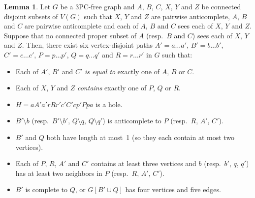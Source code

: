 \documentclass[11pt]{article}
\newcommand{\sm}{\setminus}
\theoremstyle{definition}
\newtheorem{lemma}[theorem]{Lemma}
\theoremstyle{definition}
\begin{document}
\begin{lemma}
  \label{l:exact1}
  Let $G$ be a 3PC-free graph and $A$, $B$, $C$, $X$, $Y$ and $Z$ be
  connected disjoint subsets of $V(G)$ such that $X$, $Y$ and $Z$ are
  pairwise anticomplete, $A$, $B$ and $C$ are pairwise anticomplete
  and each of $A$, $B$ and $C$ sees each of $X$, $Y$ and $Z$.  Suppose
  that no connected proper subset of $A$ (resp.\ $B$ and $C$) sees
  each of $X$, $Y$ and $Z$.  Then, there exist six vertex-disjoint
  paths $A' = a\dots a'$, $B'= b\dots b'$, $C'=c\dots c'$,
  $P= p\dots p'$, $Q = q\dots q'$ and $R = r\dots r'$ in $G$ such
  that:

  \begin{itemize}
  \item Each of $A'$, $B'$ and $C'$ \emph{is equal to} exactly one of
    $A$, $B$ or $C$.
  \item Each of $X$, $Y$ and $Z$ \emph{contains} exactly one of
    $P$, $Q$ or $R$.
  \item $H= aA'a'rRr'c'C'cp'Ppa$ is a hole.
  \item $B'\sm b$ (resp.\ $B'\sm b'$, $Q\sm q$, $Q\sm q'$) is
    anticomplete to $P$ (resp.\ $R$, $A'$, $C'$).
  \item $B'$ and $Q$ both have length at most~1 (so they each contain
    at most two vertices).  
  \item Each of $P$, $R$, $A'$ and $C'$ contains at least three
    vertices and $b$ (resp.\ $b'$, $q$, $q'$) has at least two
    neighbors in $P$ (resp.\ $R$, $A'$, $C'$). 
  \item $B'$ is complete to $Q$, or $G[B'\cup Q]$ has
    four vertices and five edges.
  \end{itemize} 
\end{lemma}
\end{document}
